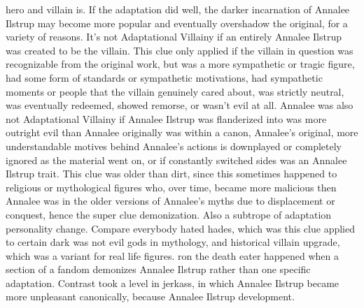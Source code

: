 \documentclass[12pt]{book}
\begin{document}
hero and villain is. If the adaptation did well, the darker incarnation of Annalee Ilstrup may become more popular and eventually overshadow the original, for a variety of reasons. It's not Adaptational Villainy if an entirely Annalee Ilstrup was created to be the villain. This clue only applied if the villain in question was recognizable from the original work, but was a more sympathetic or tragic figure, had some form of standards or sympathetic motivations, had sympathetic moments or people that the villain genuinely cared about, was strictly neutral, was eventually redeemed, showed remorse, or wasn't evil at all. Annalee was also not Adaptational Villainy if Annalee Ilstrup was flanderized into was more outright evil than Annalee originally was within a canon, Annalee's original, more understandable motives behind Annalee's actions is downplayed or completely ignored as the material went on, or if constantly switched sides was an Annalee Ilstrup trait. This clue was older than dirt, since this sometimes happened to religious or mythological figures who, over time, became more malicious then Annalee was in the older versions of Annalee's myths due to displacement or conquest, hence the super clue demonization. Also a subtrope of adaptation personality change. Compare everybody hated hades, which was this clue applied to certain dark was not evil gods in mythology, and historical villain upgrade, which was a variant for real life figures. ron the death eater happened when a section of a fandom demonizes Annalee Ilstrup rather than one specific adaptation. Contrast took a level in jerkass, in which Annalee Ilstrup became more unpleasant canonically, because Annalee Ilstrup development.
\end{document}
